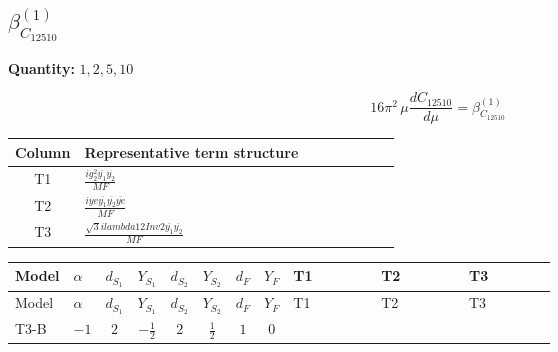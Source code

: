 \documentclass[8pt]{article}
\begin{document}
\begin{landscape}
\section*{$\beta_{C_{12510}}^{(1)}$}
\noindent\textbf{Quantity: }$\mathrm{1,2,5,10}$\par\smallskip
\[16\pi^2\,\mu\frac{d C_{12510}}{d\mu}=\beta_{C_{12510}}^{(1)}\]
\begin{center}
\begin{tabular}{@{}c >{\raggedright\arraybackslash}p{0.82\linewidth}@{}}
\toprule
Column & Representative term structure \\
\midrule
T1 & \(\displaystyle \frac{i g_{2}^{2} \overline{y_{1}} \overline{y_{2}}}{MF}\) \\
\midrule
T2 & \(\displaystyle \frac{i ye \overline{y_{1}} \overline{y_{2}} \overline{ye}}{MF}\) \\
\midrule
T3 & \(\displaystyle \frac{\sqrt{3} i lambda12Inv2 \overline{y_{1}} \overline{y_{2}}}{MF}\) \\
\midrule
\bottomrule
\end{tabular}
\end{center}
\smallskip
\tiny
\begin{longtable}{@{}llcccccc >{\raggedright\arraybackslash}p{0.21\linewidth} >{\raggedright\arraybackslash}p{0.21\linewidth} >{\raggedright\arraybackslash}p{0.21\linewidth}@{}}
\toprule
Model & $\alpha$ & $d_{S_1}$ & $Y_{S_1}$ & $d_{S_2}$ & $Y_{S_2}$ & $d_F$ & $Y_F$ & T1 & T2 & T3 \\
\midrule
\endfirsthead
\toprule
Model & $\alpha$ & $d_{S_1}$ & $Y_{S_1}$ & $d_{S_2}$ & $Y_{S_2}$ & $d_F$ & $Y_F$ & T1 & T2 & T3 \\
\midrule
\endhead
T3-B & $-1$ & $2$ & $-\frac{1}{2}$ & $2$ & $\frac{1}{2}$ & $1$ & $0$ & \scriptsize\adjustbox{max width=\linewidth}{$\begin{gathered} \frac{3 i g_{2}^{2} \overline{y_{1}} \overline{y_{2}}}{8 MF}\end{gathered}$} & \scriptsize\adjustbox{max width=\linewidth}{$\begin{gathered} - \frac{i ye \overline{y_{1}} \overline{y_{2}} \overline{ye}}{8 MF}\end{gathered}$} & \scriptsize\adjustbox{max width=\linewidth}{$\begin{gathered} \frac{\sqrt{3} i lambda12Inv2 \overline{y_{1}} \overline{y_{2}}}{6 MF}\end{gathered}$} \\
\midrule
\bottomrule
\end{longtable}
\clearpage

\end{landscape}
\end{document}
